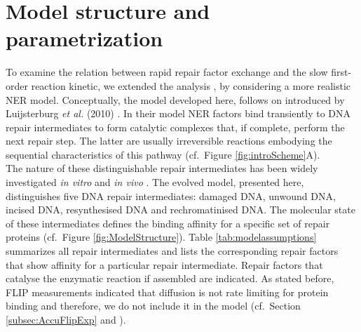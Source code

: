 \section{Model structure and parametrization}
To examine the relation between rapid repair factor exchange and the slow first-order reaction kinetic, we extended the analysis \cite{Luijsterburg2010,Terstiege2010}, by considering a more realistic NER model. Conceptually, the model developed here, follows on introduced by Luijsterburg \textit{et al.} (2010) \cite{Luijsterburg2010}. In their model NER factors bind transiently to DNA repair intermediates to form catalytic complexes that, if complete, perform the next repair step. The latter are usually irreversible reactions embodying the sequential characteristics of this pathway (cf.\ Figure \ref{fig:introScheme}A).\\
The nature of these distinguishable repair intermediates has been widely investigated \textit{in vitro} and \textit{in vivo} \cite{Evans1997a,Mu1996,Polo2006,Tapias2004}.
The evolved model, presented here, distinguishes five DNA repair intermediates: damaged DNA, unwound DNA, incised DNA, resynthesised DNA and rechromatinised DNA. The molecular state of these intermediates defines the binding affinity for a specific set of repair proteins (cf.\ Figure \ref{fig:ModelStructure}). Table \ref{tab:modelassumptions} summarizes all repair intermediates and lists the corresponding repair factors that show affinity for a particular repair intermediate. Repair factors that catalyse the enzymatic reaction if assembled are indicated. As stated before, FLIP measurements indicated that diffusion is not rate limiting for protein binding and therefore, we do not include it in the model (cf.\ Section \ref{subsec:AccuFlipExp} and \cite{Rademakers2003,Zotter2006}).              



